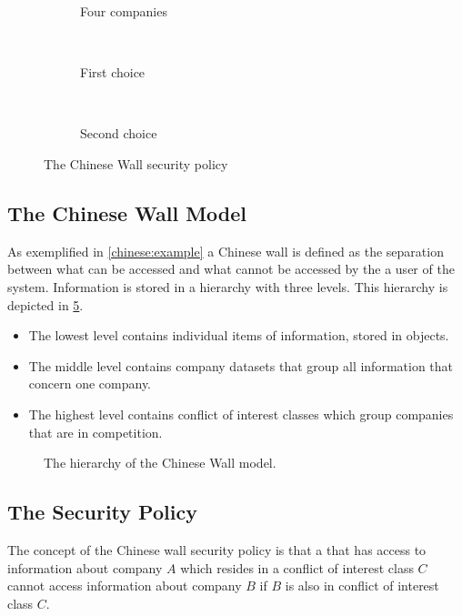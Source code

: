 \begin{figure}
\centering
    \begin{subfigure}[t]{0.3\textwidth}
        \resizebox{\linewidth}{!}{}
        \caption{Four companies}
        \label{chinese:illu:situation}
    \end{subfigure}
    ~
    \begin{subfigure}[t]{0.3\textwidth}
        \resizebox{\linewidth}{!}{}
        \caption{First choice}
        \label{chinese:illu:choice1}
    \end{subfigure}
    ~
    \begin{subfigure}[t]{0.3\textwidth}
        \resizebox{\linewidth}{!}{}
        \caption{Second choice}
        \label{chinese:illu:choice2}
    \end{subfigure}
    \caption{The Chinese Wall security policy}\label{chinese:illu}
\end{figure}


\subsection*{The Chinese Wall Model}
As exemplified in \cref{chinese:example} a Chinese wall is defined as the separation between what can be accessed and what cannot be accessed by the a user of the system.
Information is stored in a hierarchy with three levels. 
This hierarchy is depicted in \cref{china:hierarchy}.

\begin{itemize}
	\item The lowest level contains individual items of information, stored in objects.
	\item The middle level contains company datasets that group all information that concern one company. 
	\item The highest level contains conflict of interest classes which group companies that are in competition.
\end{itemize}

\begin{figure}[h]
  \resizebox{\textwidth}{!}{
	}
	\caption{The hierarchy of the Chinese Wall model.}
	\label{china:hierarchy}
\end{figure}

\subsection{The Security Policy}
The concept of the Chinese wall security policy is that a \principal{} that has access to information about company $A$ which resides in a conflict of interest class $C$ cannot access information about company $B$ if $B$ is also in conflict of interest class $C$.

